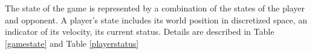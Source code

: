 The state of the game is represented by a combination of the states of the player and opponent. A player's state includes its world position in discretized space, an indicator of its velocity, its current status. Details are described in Table \ref{gamestate} and Table \ref{playerstatus}














